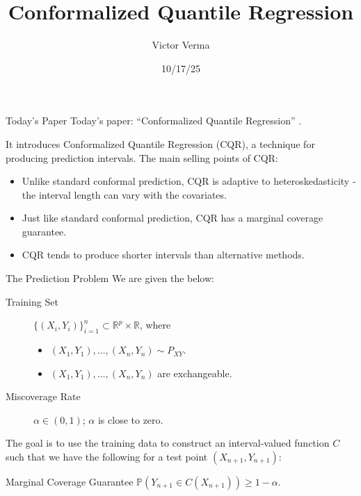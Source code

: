 \documentclass{beamer}
\title[Conformalized Quantile Regression]{
    Conformalized Quantile Regression
}
\author{Victor Verma}
\institute[]{
    Department of Statistics, University of Michigan
}
\date[10/17/25]{10/17/25}
\newcommand{\Prob}{\mathbb{P}}
\newcommand{\R}{\mathbb{R}}
\begin{document}
\begin{frame}
    \titlepage
\end{frame}

\begin{frame}{Today's Paper}
    Today's paper: ``Conformalized Quantile Regression''  \citep[][]{romano2019conf}.

    \medskip

    It introduces Conformalized Quantile Regression (CQR), a technique for producing prediction intervals. The main selling points of CQR:
    \begin{itemize}
        \item Unlike standard conformal prediction, CQR is adaptive to heteroskedasticity - the interval length can vary with the covariates.
        \item Just like standard conformal prediction, CQR has a marginal coverage guarantee.
        \item CQR tends to produce shorter intervals than alternative methods.
    \end{itemize}
\end{frame}

\begin{frame}{The Prediction Problem}
    We are given the below:
    \begin{description}
        \item[Training Set] $\{(X_i, Y_i)\}_{i = 1}^n \subset \R^p \times \R$, where
        \begin{itemize}
            \item $(X_1, Y_1), \ldots, (X_n, Y_n) \sim P_{X Y}$.
            \item $(X_1, Y_1), \ldots, (X_n, Y_n)$ are exchangeable.
        \end{itemize}
        \item[Miscoverage Rate] $\alpha \in (0, 1)$; $\alpha$ is close to zero.
    \end{description}

    The goal is to use the training data to construct an interval-valued function $C$ such that we have the following for a test point $(X_{n + 1}, Y_{n + 1})$:
    \begin{block}{Marginal Coverage Guarantee}
        $\Prob(Y_{n + 1} \in C(X_{n + 1})) \ge 1 - \alpha$.
    \end{block}
\end{frame}
\end{document}
